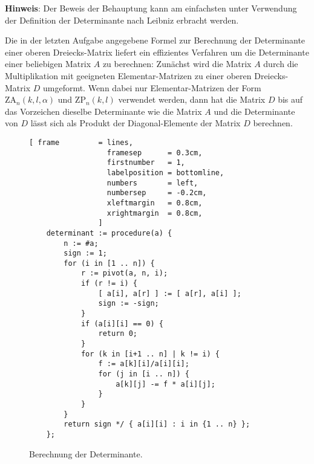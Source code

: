 \noindent
\textbf{Hinweis}:  Der Beweis der Behauptung kann am einfachsten unter Verwendung der Definition
der Determinante nach Leibniz erbracht werden. 
\eoxs

\remark
Die in der letzten Aufgabe angegebene Formel zur Berechnung der Determinante einer oberen
Dreiecks-Matrix liefert ein effizientes Verfahren um die Determinante einer beliebigen Matrix $A$ zu
berechnen:  Zun\"achst wird die Matrix $A$ durch die Multiplikation mit geeigneten Elementar-Matrizen
zu einer oberen Dreiecks-Matrix $D$ umgeformt.  Wenn dabei nur Elementar-Matrizen der Form
$\mathrm{ZA}_n(k,l,\alpha)$ und $\mathrm{ZP}_n(k,l)$ verwendet werden, dann hat die Matrix $D$ bis
auf das Vorzeichen  dieselbe Determinante wie die Matrix $A$ und die Determinante von $D$ l\"asst
sich als Produkt der Diagonal-Elemente der Matrix $D$ berechnen.  

\begin{figure}[!ht]
\centering
\begin{Verbatim}[ frame         = lines, 
                  framesep      = 0.3cm, 
                  firstnumber   = 1,
                  labelposition = bottomline,
                  numbers       = left,
                  numbersep     = -0.2cm,
                  xleftmargin   = 0.8cm,
                  xrightmargin  = 0.8cm,
                ]
    determinant := procedure(a) {
        n := #a;              
        sign := 1;
        for (i in [1 .. n]) {
            r := pivot(a, n, i);
            if (r != i) {
                [ a[i], a[r] ] := [ a[r], a[i] ];   
                sign := -sign;
            }
            if (a[i][i] == 0) {
                return 0;
            }
            for (k in [i+1 .. n] | k != i) {
                f := a[k][i]/a[i][i];
                for (j in [i .. n]) {
                    a[k][j] -= f * a[i][j];
                }
            }    
        }
        return sign */ { a[i][i] : i in {1 .. n} };
    };
\end{Verbatim}
\vspace*{-0.3cm}
\caption{Berechnung der Determinante.}
\label{fig:determinant-algorithm.stlx}
\end{figure}

